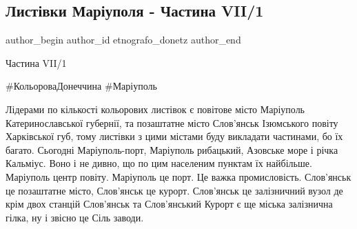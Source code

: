  
 
 
 
 

\subsection{Листівки Маріуполя - Частина VII/1}
\label{sec:07_05_2023.fb.etnografo_donetz.1.lystivky_mariupolja_chastyna_vii_1}

\ifcmt
 author_begin
   author_id etnografo_donetz
 author_end
\fi

Частина VII/1

\#КольороваДонеччина
\#Маріуполь

Лідерами  по кількості кольорових листівок є повітове місто Маріуполь
Катеринославської губернії, та позаштатне місто Слов'янськ Ізюмського повіту
Харківської губ, тому листівки з цими містами буду викладати частинами, бо їх
багато. Сьогодні Маріуполь-порт, Маріуполь рибацький, Азовське море і річка
Кальміус. Воно і не дивно, що по цим населеним пунктам їх найбільше. Маріуполь
центр повіту. Маріуполь це порт. Це важка промисловість. Слов'янськ це
позаштатне місто,  Слов'янськ це курорт. Слов'янськ це залізничний вузол де
крім двох станцій Слов'янськ та Слов'янський Курорт є ще міська залізнична
гілка, ну і звісно це Сіль заводи.

